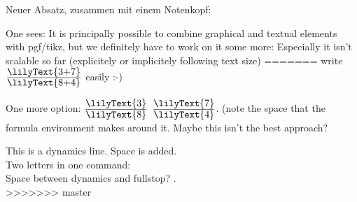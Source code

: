 \documentclass{scrartcl}
\newcommand*{\lilyTimeSignature}[2]{$\frac{\mbox{\lilyText{#1}}}{\mbox{\lilyText{#2}}}$}
\begin{document}
\normalsize
Neuer Absatz, zusammen mit einem Notenkopf: 

One sees: It is principally possible to combine graphical and textual elements with pgf/tikz,
but we definitely have to work on it some more: Especially it isn't scalable so far (explicitely or implicitely following text size)
=======
	write \lilyTimeSignature{3+7}{8+4} easily :-)
	
	One more option: \lilyTimeSignature{3}{8} \lilyText{+} \lilyTimeSignature{7}{4}. (note the space that the formula environment makes around it. Maybe this isn't the best approach?

	This is a dynamics  line. Space is added.\\
	Two letters in one command: \\
	Space between dynamics and fullstop? .\\
	
	
>>>>>>> master
\end{document}
